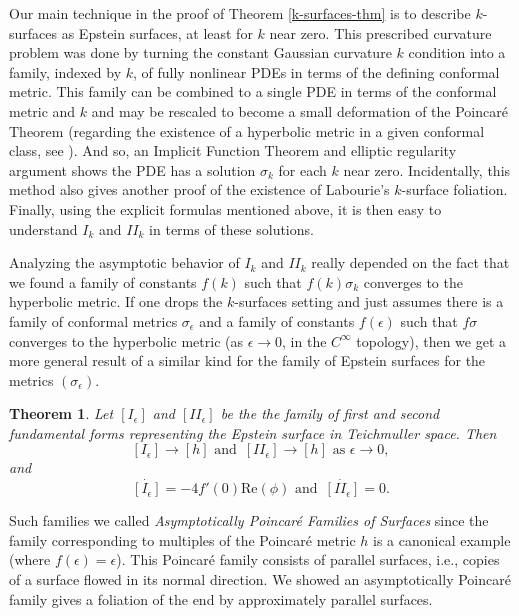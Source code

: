 \documentclass[11pt]{amsart}
\newtheorem{thm}{Theorem}[section]
\begin{document}
Our main technique in the proof of Theorem \ref{k-surfaces-thm} is to describe $k$-surfaces as Epstein surfaces, at least for $k$ near zero. 
This prescribed curvature problem was done by turning the constant Gaussian curvature $k$ condition into a family, indexed by $k$, of fully nonlinear PDEs in terms of the defining conformal metric. 
This family can be combined to a single PDE in terms of the conformal metric and $k$ and may be rescaled to become a small deformation of the Poincar\'e Theorem (regarding the existence of a hyperbolic metric in a given conformal class, see \cite{tromba1992}). 
And so, an Implicit Function Theorem and elliptic regularity argument shows the PDE has a solution $\sigma_k$ for each $k$ near zero. 
Incidentally, this method also gives another proof of the existence of Labourie's $k$-surface foliation. 
Finally, using the explicit formulas mentioned above, it is then easy to understand $I_k$ and $I\!I_k$ in terms of these solutions. 


Analyzing the asymptotic behavior of $I_k$ and $I\!I_k$ really depended on the fact that we found a family of constants $f(k)$ such that $f(k)\sigma_k$ converges to the hyperbolic metric. 
If one drops the $k$-surfaces setting and just assumes there is a family of conformal metrics $\sigma_\epsilon$ and a family of constants $f(\epsilon)$ such that $f\sigma$ converges to the hyperbolic metric (as $\epsilon \to 0$, in the $C^\infty$ topology), then we get a more general result of a similar kind for the family of Epstein surfaces for the metrics $(\sigma_\epsilon)$. 

\begin{thm}
\label{asym-poincare-thm}
Let $[I_\epsilon]$ and $[I\!I_\epsilon]$ be the the family of first and second fundamental forms representing the Epstein surface in Teichmuller space. 
Then
\[
[I_\epsilon] \to  [h]  \text{ and } \, [I\!I_\epsilon] \to [h]  \text{ as } \epsilon \to 0,
\]
and
\[
\dot{[I_\epsilon]} = -4 f'(0) \mathrm{Re}(\phi) \text{ and } \, \dot{[I\!I_\epsilon]} = 0. 
\]
\end{thm}

Such families we called \emph{Asymptotically Poincar\'e Families of Surfaces} since the family corresponding to multiples of the Poincar\'e metric $h$ is a canonical example (where $f(\epsilon) = \epsilon$). 
This Poincar\'e family consists of parallel surfaces, i.e., copies of a surface flowed in its normal direction. 
We showed an asymptotically Poincar\'e family gives a foliation of the end by approximately parallel surfaces.
\end{document}
